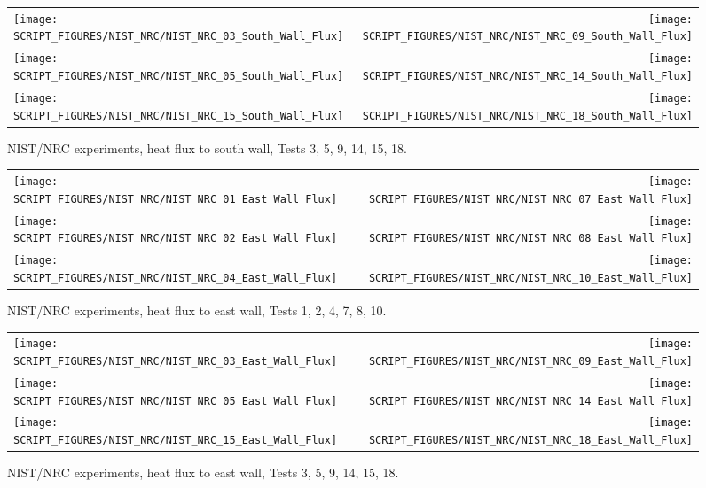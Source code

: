\begin{figure}[p]
\begin{tabular*}{\textwidth}{l@{\extracolsep{\fill}}r}
\texttt{[image: SCRIPT\_FIGURES/NIST\_NRC/NIST\_NRC\_03\_South\_Wall\_Flux]} &
\texttt{[image: SCRIPT\_FIGURES/NIST\_NRC/NIST\_NRC\_09\_South\_Wall\_Flux]} \\
\texttt{[image: SCRIPT\_FIGURES/NIST\_NRC/NIST\_NRC\_05\_South\_Wall\_Flux]} &
\texttt{[image: SCRIPT\_FIGURES/NIST\_NRC/NIST\_NRC\_14\_South\_Wall\_Flux]} \\
\texttt{[image: SCRIPT\_FIGURES/NIST\_NRC/NIST\_NRC\_15\_South\_Wall\_Flux]} &
\texttt{[image: SCRIPT\_FIGURES/NIST\_NRC/NIST\_NRC\_18\_South\_Wall\_Flux]}
\end{tabular*}
\caption{NIST/NRC experiments, heat flux to south wall, Tests 3, 5, 9, 14, 15, 18.}
\label{NIST_NRC_South_Wall_Flux_Open}
\end{figure}


\begin{figure}[p]
\begin{tabular*}{\textwidth}{l@{\extracolsep{\fill}}r}
\texttt{[image: SCRIPT\_FIGURES/NIST\_NRC/NIST\_NRC\_01\_East\_Wall\_Flux]} &
\texttt{[image: SCRIPT\_FIGURES/NIST\_NRC/NIST\_NRC\_07\_East\_Wall\_Flux]} \\
\texttt{[image: SCRIPT\_FIGURES/NIST\_NRC/NIST\_NRC\_02\_East\_Wall\_Flux]} &
\texttt{[image: SCRIPT\_FIGURES/NIST\_NRC/NIST\_NRC\_08\_East\_Wall\_Flux]} \\
\texttt{[image: SCRIPT\_FIGURES/NIST\_NRC/NIST\_NRC\_04\_East\_Wall\_Flux]} &
\texttt{[image: SCRIPT\_FIGURES/NIST\_NRC/NIST\_NRC\_10\_East\_Wall\_Flux]}
\end{tabular*}
\caption{NIST/NRC experiments, heat flux to east wall, Tests 1, 2, 4, 7, 8, 10.}
\label{NIST_NRC_East_Wall_Flux_Closed}
\end{figure}

\begin{figure}[p]
\begin{tabular*}{\textwidth}{l@{\extracolsep{\fill}}r}
\texttt{[image: SCRIPT\_FIGURES/NIST\_NRC/NIST\_NRC\_03\_East\_Wall\_Flux]} &
\texttt{[image: SCRIPT\_FIGURES/NIST\_NRC/NIST\_NRC\_09\_East\_Wall\_Flux]} \\
\texttt{[image: SCRIPT\_FIGURES/NIST\_NRC/NIST\_NRC\_05\_East\_Wall\_Flux]} &
\texttt{[image: SCRIPT\_FIGURES/NIST\_NRC/NIST\_NRC\_14\_East\_Wall\_Flux]} \\
\texttt{[image: SCRIPT\_FIGURES/NIST\_NRC/NIST\_NRC\_15\_East\_Wall\_Flux]} &
\texttt{[image: SCRIPT\_FIGURES/NIST\_NRC/NIST\_NRC\_18\_East\_Wall\_Flux]}
\end{tabular*}
\caption{NIST/NRC experiments, heat flux to east wall, Tests 3, 5, 9, 14, 15, 18.}
\label{NIST_NRC_East_Wall_Flux_Open}
\end{figure}


